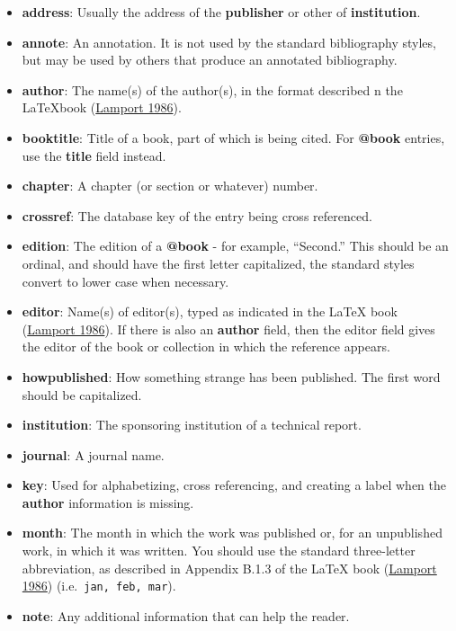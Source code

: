 \documentclass[
]{article}
\providecommand{\tightlist}{%
  \setlength{\itemsep}{0pt}\setlength{\parskip}{0pt}}
\begin{document}
\begin{itemize}
\tightlist
\item
  \textbf{address}: Usually the address of the \textbf{publisher} or
  other of \textbf{institution}.
\item
  \textbf{annote}: An annotation. It is not used by the standard
  bibliography styles, but may be used by others that produce an
  annotated bibliography.
\item
  \textbf{author}: The name(s) of the author(s), in the format described
  n the \LaTeX book (\protect\hyperlink{ref-lamport86latex}{Lamport
  1986}).
\item
  \textbf{booktitle}: Title of a book, part of which is being cited. For
  \textbf{@book} entries, use the \textbf{title} field instead.
\item
  \textbf{chapter}: A chapter (or section or whatever) number.
\item
  \textbf{crossref}: The database key of the entry being cross
  referenced.
\item
  \textbf{edition}: The edition of a \textbf{@book} - for example,
  ``Second.'' This should be an ordinal, and should have the first
  letter capitalized, the standard styles convert to lower case when
  necessary.
\item
  \textbf{editor}: Name(s) of editor(s), typed as indicated in the LaTeX
  book (\protect\hyperlink{ref-lamport86latex}{Lamport 1986}). If there
  is also an \textbf{author} field, then the editor field gives the
  editor of the book or collection in which the reference appears.
\item
  \textbf{howpublished}: How something strange has been published. The
  first word should be capitalized.
\item
  \textbf{institution}: The sponsoring institution of a technical
  report.
\item
  \textbf{journal}: A journal name.
\item
  \textbf{key}: Used for alphabetizing, cross referencing, and creating
  a label when the \textbf{author} information is missing.
\item
  \textbf{month}: The month in which the work was published or, for an
  unpublished work, in which it was written. You should use the standard
  three-letter abbreviation, as described in Appendix B.1.3 of the LaTeX
  book (\protect\hyperlink{ref-lamport86latex}{Lamport 1986})
  (i.e.~\texttt{jan,\ feb,\ mar}).
\item
  \textbf{note}: Any additional information that can help the reader.

\end{itemize}
\end{document}
